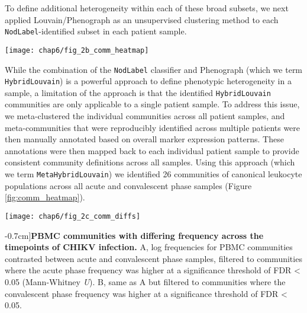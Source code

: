 To define additional heterogeneity within each of these broad subsets, we next applied Louvain/Phenograph\autocite{Levine2015a} as an unsupervised clustering method to each \texttt{NodLabel}-identified subset in each patient sample.
\begin{figure*}[htb]
  \texttt{[image: chap6/fig\_2b\_comm\_heatmap]}
  \caption[CyTOF signatures for acute CHIKV infection based on canonical immune cell phenotypes]{\textbf{CyTOF reveals signatures for acute CHIKV infection based on canonical immune cell phenotype clustering.} Heatmap of log scaled peripheral blood mononuclear cell (PBMC) community frequencies for all samples. Clinical variables are depicted for all samples across the top of the heatmap; 15d post symptom onset immunoglobulin G (IgG) titer and viral titer (which was measured during the acute phase) are both in units of log dilutions. Hierarchical clustering (using complete linkage) was applied to both samples (X axis) and communities (Y axis). Four major clusters of communities and two major clusters of samples (largely separating acute and convalescent samples) are highlighted. 
  }
  \label{fig:comm_heatmap}
\end{figure*}
While the combination of the \texttt{NodLabel} classifier and Phenograph (which we term \texttt{HybridLouvain}) is a powerful approach to define phenotypic heterogeneity in a sample, a limitation of the approach is that the identified \texttt{HybridLouvain} communities are only applicable to a single patient sample. To address this issue, we meta-clustered the individual communities across all patient samples, and meta-communities that were reproducibly identified across multiple patients were then manually annotated based on overall marker expression patterns. These annotations were then mapped back to each individual patient sample to provide consistent community definitions across all samples. Using this approach (which we term \texttt{MetaHybridLouvain}) we identified 26 communities of canonical leukocyte populations across all acute and convalescent phase samples (Figure \ref{fig:comm_heatmap}).
\begin{figure*}[htb]
  \texttt{[image: chap6/fig\_2c\_comm\_diffs]}
  \caption[PBMC communities with differing frequency across the CHIKV infection phases][-0.7cm]{\textbf{PBMC communities with differing frequency across the timepoints of CHIKV infection.} A, log frequencies for PBMC communities contrasted between acute and convalescent phase samples, filtered to communities where the acute phase frequency was higher at a significance threshold of FDR < 0.05 (Mann-Whitney \emph{U}). B, same as A but filtered to communities where the convalescent phase frequency was higher at a significance threshold of FDR < 0.05.
  }
  \label{fig:comm_diffs}
\end{figure*}
